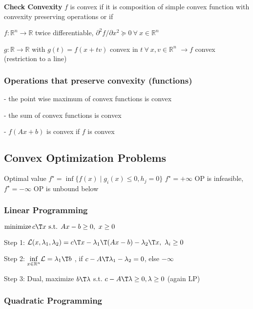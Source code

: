 \textbf{Check Convexity} $f$ is convex if it is
composition of simple convex function
with convexity preserving operations
or if


$f: \mathbb{R}^n \rightarrow \mathbb{R}$ twice differentiable,
$\partial^2f/\partial x^2 \succeq 0\ \forall\ x \in \mathbb{R}^{n}$

$g: \mathbb{R} \rightarrow \mathbb{R}$ with $g(t)=f(x+tv)$
convex in $t\ \forall\ x,v \in \mathbb{R}^{n}$
$\rightarrow f$ convex (restriction to a line)



\subsubsection{Operations that preserve convexity (functions)}

- the point wise maximum of convex functions is convex

- the sum of convex functions is convex

- $f(Ax+b)$ is convex if $f$ is convex

\subsection{Convex Optimization Problems}


Optimal value $f^\star =
	\operatorname{inf}\{f(x)\mid
	g_i(x)\le0,h_j=0 \}$
$f^\star=+\infty$ OP is infeasible,
$f^\star=-\infty$ OP is unbound below



\subsubsection{Linear Programming}
$ \operatorname{minimize} c\T x
	\text{ s.t. } Ax-b \ge 0,\ x\ge0$

Step 1:
$\mathcal{L}(x,\lambda_1,\lambda_2) =
	c\T x-\lambda_1\T (Ax-b) -\lambda_2\T x,\ \lambda_i \ge0$

Step 2:
$\underset{x \in \mathcal{\mathbb{R}}^n}{\operatorname{inf}}
	\mathcal{L}=\lambda_1\T b$
, if $c-A\T\lambda_1-\lambda_2=0$, else $-\infty$

Step 3: Dual,
maximize $b\T\lambda$
s.t.
$c-A\T\lambda\ge0,\lambda\ge0$
(again LP)

\subsubsection{Quadratic Programming}

